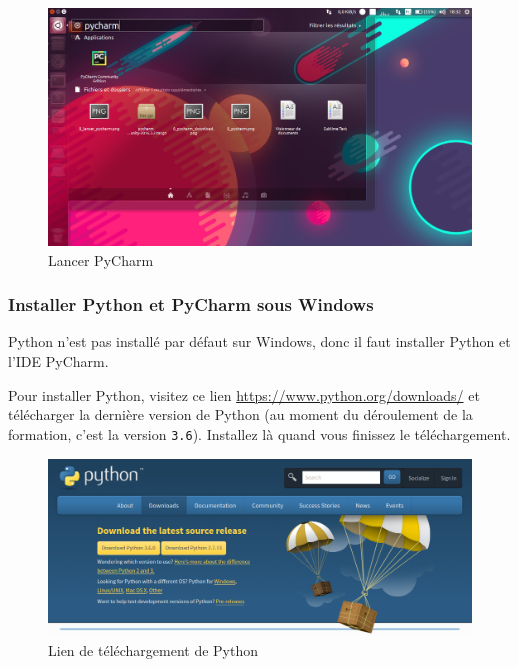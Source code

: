 \documentclass[12pt]{article}
\newcommand{\code}[1]{\colorbox{light-gray}{\texttt{#1}}}
\begin{document}
            \begin{figure}[H]
                \centering
                \includegraphics[width=\linewidth]{img/8_lancer_pycharm.png}
                \caption{Lancer PyCharm}
                \label{launch_pycharm}
            \end{figure}
        \subsubsection{Installer Python et PyCharm sous Windows}
            Python n'est pas installé par défaut sur Windows, donc il faut installer Python et l'IDE PyCharm.

            Pour installer Python, visitez ce lien
            \href{https://www.python.org/downloads/}{https://www.python.org/downloads/} et télécharger la
            dernière version de Python (au moment du déroulement de la formation, c'est la version \code{3.6}).
            Installez là quand vous finissez le téléchargement.

            \begin{figure}[H]
                \centering
                \includegraphics[width=\linewidth]{img/8_python_download.png}
                \caption{Lien de téléchargement de Python}
            \end{figure}
\end{document}
